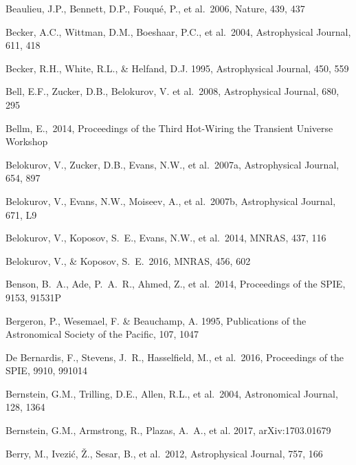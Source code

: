 \documentclass[twocolumn]{aastex61}
\begin{document}
\begin{thebibliography}{}
 Beaulieu, J.P., Bennett, D.P., Fouqu\'{e}, P., et al.~2006, Nature, 439, 437

 Becker, A.C., Wittman, D.M., Boeshaar, P.C., et al.~2004, Astrophysical Journal, 611, 418

 Becker, R.H., White, R.L., \& Helfand, D.J. 1995, Astrophysical Journal, 450, 559

 Bell, E.F., Zucker, D.B., Belokurov, V. et al.~2008, Astrophysical Journal, 680, 295

 Bellm, E.,~2014, Proceedings of the Third Hot-Wiring the Transient Universe Workshop

 Belokurov, V., Zucker, D.B., Evans, N.W., et al.~2007a, Astrophysical Journal, 654, 897

 Belokurov, V., Evans, N.W., Moiseev, A., et al.~2007b, Astrophysical Journal, 671, L9

 Belokurov, V., Koposov, S.~E., Evans, N.W., et al.~2014, MNRAS, 437, 116

 Belokurov, V., \& Koposov, S.~E.\ 2016, MNRAS, 456, 602

 Benson, B.~A., Ade, P.~A.~R., Ahmed, Z., et al.\ 2014, Proceedings of the SPIE, 9153, 91531P

 Bergeron, P., Wesemael, F. \& Beauchamp, A. 1995, Publications of the Astronomical Society of the Pacific, 107, 1047

 De Bernardis, F., Stevens, J.~R., Hasselfield, M., et al.\ 2016, Proceedings of the SPIE, 9910, 991014

 Bernstein, G.M., Trilling, D.E., Allen, R.L., et al.~2004, Astronomical Journal, 128, 1364

 Bernstein, G.M., Armstrong, R., Plazas, A.~A., et al. 2017, arXiv:1703.01679

 Berry, M., Ivezi\'c, \v Z., Sesar, B., et al.~2012, Astrophysical Journal, 757, 166


\end{thebibliography}
\end{document}
